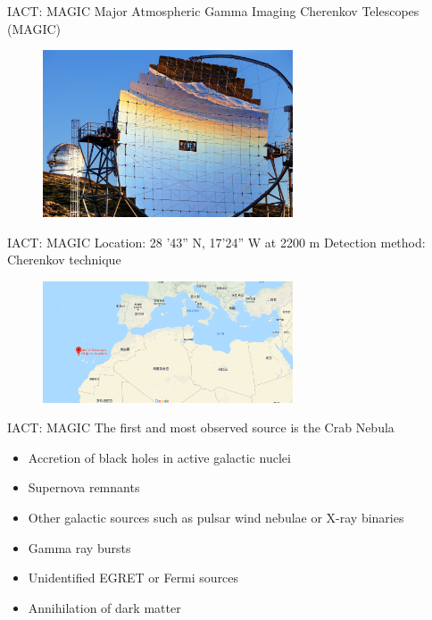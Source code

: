 \documentclass{beamer}
\begin{document}
\begin{frame}{IACT: MAGIC}
    Major Atmospheric Gamma Imaging Cherenkov Telescopes (MAGIC)
    \begin{figure}[h]
        \includegraphics[width=280px]{MAGIC_mirror.jpg}
    \end{figure}
\end{frame}


\begin{frame}{IACT: MAGIC}
    Location: 28 '43'' N, 17'24'' W at 2200 m
    \newline
    Detection method: Cherenkov technique
    \begin{figure}[h]
        \includegraphics[width=280px]{MAGIC_location.png}
    \end{figure}
\end{frame}

\begin{frame}{IACT: MAGIC}
    The first and most observed source is the Crab Nebula
    \begin{itemize}
        \item Accretion of black holes in active galactic nuclei
        \item Supernova remnants
        \item Other galactic sources such as pulsar wind nebulae or X-ray binaries
        \item Gamma ray bursts
        \item Unidentified EGRET or Fermi sources
        \item Annihilation of dark matter
    \end{itemize}
\end{frame}
\end{document}
